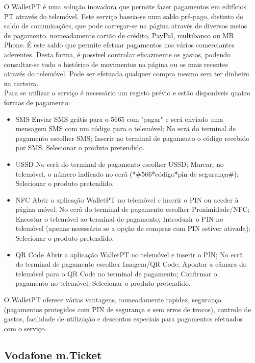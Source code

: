 O WalletPT é uma solução inovadora que permite fazer pagamentos em edifícios PT através do telemóvel. Este serviço baseia-se num saldo pré-pago, distinto do saldo de comunicações, que pode carregar-se na página \web através de diversos meios de pagamento, nomeadamente cartão de crédito, PayPal, multibanco ou MB Phone. É este saldo que permite efetuar pagamentos nos vários comerciantes aderentes. Desta forma, é possível controlar eficazmente os gastos, podendo consultar-se todo o histórico de movimentos na página \web ou os mais recentes através do telemóvel. Pode ser efetuada qualquer compra mesmo sem ter dinheiro na carteira.
\\Para se utilizar o serviço é necessário um registo prévio e estão disponíveis quatro formas de pagamento:
\begin{itemize}
\item SMS
\subitem Enviar SMS grátis para o 5665 com "pagar" e será enviado uma mensagem SMS com um código para o telemóvel;
\subitem No ecrã do terminal de pagamento escolher SMS;
\subitem Inserir no terminal de pagamento o código recebido por SMS;
\subitem Selecionar o produto pretendido.
\item USSD
\subitem No ecrã do terminal de pagamento escolher USSD;
\subitem Marcar, no telemóvel, o número indicado no ecrã (*\#566*código*pin de segurança\#);
\subitem Selecionar o produto pretendido.
\item NFC
\subitem Abrir a aplicação WalletPT no telemóvel e inserir o PIN ou aceder à página \web móvel;
\subitem No ecrã do terminal de pagamento escolher Proximidade/NFC;
\subitem Encostar o telemóvel ao terminal de pagamento;
\subitem Introduzir o PIN no telemóvel (apenas necessário se a opção de compras com PIN estiver ativada);
\subitem Selecionar o produto pretendido.
\item QR Code
\subitem Abrir a aplicação WalletPT no telemóvel e inserir o PIN;
\subitem No ecrã do terminal de pagamento escolher Imagem/QR Code;
\subitem Apontar a câmara do telemóvel para o QR Code no terminal de pagamento;
\subitem Confirmar o pagamento no telemóvel;
\subitem Selecionar o produto pretendido.
\end{itemize}
O WalletPT oferece várias vantagens, nomeadamente rapidez, segurança (pagamentos protegidos com PIN de segurança e sem erros de trocos), controlo de gastos, facilidade de utilização e descontos especiais para pagamentos efetuados com o serviço.\cite{walletpt}

\subsection{Vodafone m.Ticket}

